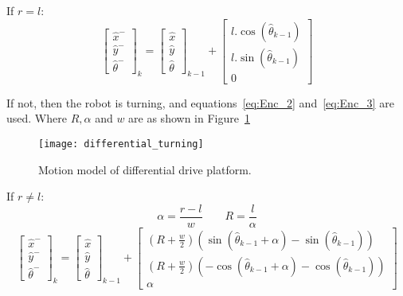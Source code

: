 If $ r = l $:
\begin{equation}
\label{eq:Enc_1}
	\begin{bmatrix}
		\hat{x}^-\\\hat{y}^-\\\hat{\theta}^-
	\end{bmatrix}_k
	=
	\begin{bmatrix}
		\hat{x}\\\hat{y}\\\hat{\theta}
	\end{bmatrix}_{k-1}
	+
	\begin{bmatrix}
		l.\cos(\hat{\theta}_{k-1})\\
		l.\sin(\hat{\theta}_{k-1})\\
		0
	\end{bmatrix}
\end{equation}	

If not, then the robot is turning, and equations~\ref{eq:Enc_2} and~\ref{eq:Enc_3} are used. Where $ R,\alpha $ and $ w $ are as shown in Figure~\ref{fig:Enc_1}
			
\begin{figure}
\centering
\texttt{[image: differential\_turning]}
\caption{Motion model of differential drive platform.}
\label{fig:Enc_1}
\end{figure}
If $ r \neq l $:
\begin{equation}
\label{eq:Enc_2}
	\alpha= \frac{r-l}{w}
\qquad
	R=\frac{l}{\alpha}
\end{equation}
\begin{equation}
\label{eq:Enc_3}
	\begin{bmatrix}
		\hat{x}^-\\\hat{y}^-\\\hat{\theta}^-
	\end{bmatrix}_k
	=
	\begin{bmatrix}
		\hat{x}\\\hat{y}\\\hat{\theta}
	\end{bmatrix}_{k-1}
	+
	\begin{bmatrix}
		\left(R+\frac{w}{2}\right)(\sin(\hat{\theta}_{k-1}+\alpha)-\sin(\hat{\theta}_{k-1}))\\
		\left(R+\frac{w}{2}\right)(-\cos(\hat{\theta}_{k-1}+\alpha)-\cos(\hat{\theta}_{k-1}))\\
		\alpha
	\end{bmatrix}
\end{equation}

